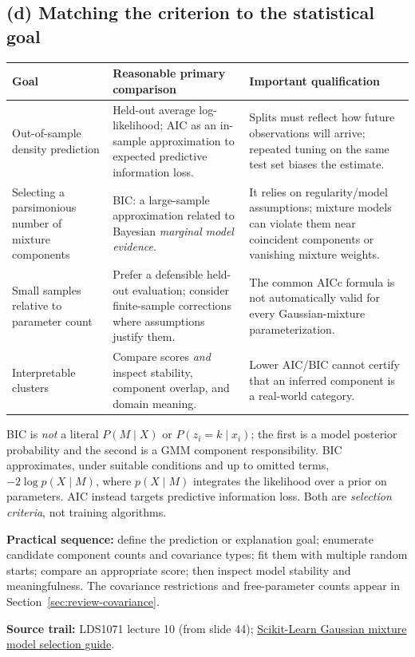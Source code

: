 \subsection*{(d) Matching the criterion to the statistical goal}
\begin{center}\small
\renewcommand{\arraystretch}{1.2}
\begin{tabularx}{\textwidth}{@{}p{3.25cm}X X@{}}\toprule
Goal & Reasonable primary comparison & Important qualification\\\midrule
Out-of-sample density prediction & Held-out average log-likelihood; AIC as an in-sample approximation to expected predictive information loss. & Splits must reflect how future observations will arrive; repeated tuning on the same test set biases the estimate.\\
Selecting a parsimonious number of mixture components & BIC: a large-sample approximation related to Bayesian \emph{marginal model evidence}. & It relies on regularity/model assumptions; mixture models can violate them near coincident components or vanishing mixture weights.\\
Small samples relative to parameter count & Prefer a defensible held-out evaluation; consider finite-sample corrections where assumptions justify them. & The common AICc formula is not automatically valid for every Gaussian-mixture parameterization.\\
Interpretable clusters & Compare scores \emph{and} inspect stability, component overlap, and domain meaning. & Lower AIC/BIC cannot certify that an inferred component is a real-world category.\\\bottomrule
\end{tabularx}
\end{center}
\begin{important}
BIC is \emph{not} a literal $P(M\mid X)$ or $P(z_i=k\mid x_i)$; the first is a model posterior probability and the second is a GMM component responsibility. BIC approximates, under suitable conditions and up to omitted terms, $-2\log p(X\mid M)$, where $p(X\mid M)$ integrates the likelihood over a prior on parameters. AIC instead targets predictive information loss. Both are \emph{selection criteria}, not training algorithms.
\end{important}
\textbf{Practical sequence:} define the prediction or explanation goal; enumerate candidate component counts and covariance types; fit them with multiple random starts; compare an appropriate score; then inspect model stability and meaningfulness. The covariance restrictions and free-parameter counts appear in Section~\ref{sec:review-covariance}.

\textbf{Source trail:} LDS1071 lecture 10 (from slide 44); \href{https://scikit-learn.org/stable/auto_examples/mixture/plot_gmm_selection.html}{Scikit-Learn Gaussian mixture model selection guide}.
